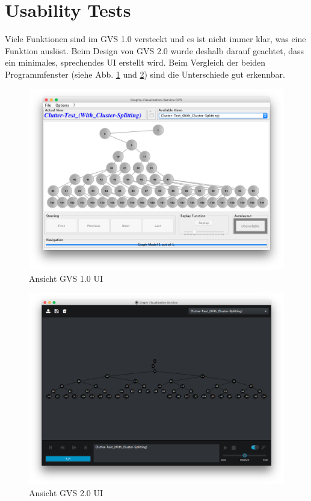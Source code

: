 \documentclass[11pt,a4paper,english,oneside]{book}
\numberwithin{equation}{chapter}
\begin{document}
	\section{Usability Tests}
	Viele Funktionen sind im GVS 1.0 versteckt und es ist nicht immer klar, was eine Funktion auslöst. Beim Design von GVS 2.0 wurde deshalb darauf geachtet, dass ein minimales, sprechendes UI erstellt wird. Beim Vergleich der beiden Programmfenster (siehe Abb. \ref{fig:gvs-1} und \ref{fig:gvs-2}) sind die Unterschiede gut erkennbar. 
	
	\begin{figure}[h!]
		\centering
		\includegraphics[width=0.6\linewidth]{assets/images/gvs-1}
		\caption{Ansicht GVS 1.0 UI}
		\label{fig:gvs-1}
	\end{figure}

	\begin{figure}[h!]
		\centering
		\includegraphics[width=0.6\linewidth]{assets/images/gvs-2}
		\caption{Ansicht GVS 2.0 UI}
		\label{fig:gvs-2}
	\end{figure}
	
\end{document}
